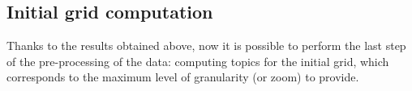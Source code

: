 \begin{algorithm}[h]

          
\end{algorithm}




\subsection{Initial grid computation}

Thanks to the results obtained above, now it is possible to perform the last step of the pre-processing of the data: computing topics for the initial grid, which corresponds to the maximum level of granularity (or zoom) to provide.

